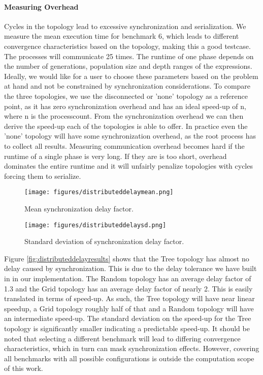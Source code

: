 \paragraph{Measuring Overhead}
Cycles in the topology lead to excessive synchronization and serialization. We measure the mean execution time for benchmark 6, which leads to different convergence characteristics based on the topology, making this a good testcase. The processes will communicate 25 times. 
The runtime of one phase depends on the number of generations, population size and depth ranges of the expressions. 
Ideally, we would like for a user to choose these parameters based on the problem at hand and not be constrained by synchronization considerations. To compare the three topologies, we use the disconnected or 'none' topology as a reference point, as it has zero synchronization overhead and has an ideal speed-up of n, where n is the processcount. From the synchronization overhead we can then derive the speed-up each of the topologies is able to offer. In practice even the 'none' topology will have some synchronization overhead, as the root process has to collect all results.
Measuring communication overhead becomes hard if the runtime of a single phase is very long. If they are is too short, overhead dominates the entire runtime and it will unfairly penalize topologies with cycles forcing them to serialize. 

\begin{figure*}
    \centering
    \begin{subfigure}{0.5\textwidth}
    \centering
        \texttt{[image: figures/distributeddelaymean.png]}
        \caption{Mean synchronization delay factor.}
    \end{subfigure}%
    \begin{subfigure}{0.5\textwidth}
    \centering
        \texttt{[image: figures/distributeddelaysd.png]}
        \caption{Standard deviation of synchronization delay factor.}
    \end{subfigure}
    \caption{Synchronization overhead introduced by topologies.}
    \label{fig:distributeddelayresults}
    \end{figure*}
    
Figure \ref{fig:distributeddelayresults} shows that the Tree topology has almost no delay caused by synchronization. This is due to the delay tolerance we have built in in our implementation. The Random topology has an average delay factor of 1.3 and the Grid topology has an average delay factor of nearly 2. This is easily translated in terms of speed-up. As such, the Tree topology will have near linear speedup, a Grid topology roughly half of that and a Random topology will have an intermediate speed-up. The standard deviation on the speed-up for the Tree topology is significantly smaller indicating a predictable speed-up. 
It should be noted that selecting a different benchmark will lead to differing convergence characteristics, which in turn can mask synchronization effects. However, covering all benchmarks with all possible configurations is outside the computation scope of this work. 

